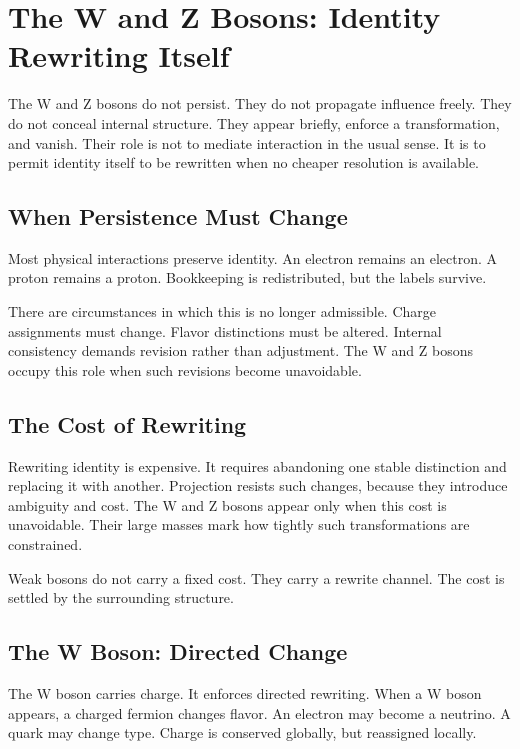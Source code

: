 \documentclass[11pt,twoside,openright]{book}
\begin{document}
\chapter{The W and Z Bosons: Identity Rewriting Itself}

The W and Z bosons do not persist. They do not propagate influence freely. They do not conceal internal structure. They appear briefly, enforce a transformation, and vanish. Their role is not to mediate interaction in the usual sense. It is to permit identity itself to be rewritten when no cheaper resolution is available.

\section*{When Persistence Must Change}

Most physical interactions preserve identity. An electron remains an electron. A proton remains a proton. Bookkeeping is redistributed, but the labels survive.

There are circumstances in which this is no longer admissible. Charge assignments must change. Flavor distinctions must be altered. Internal consistency demands revision rather than adjustment. The W and Z bosons occupy this role when such revisions become unavoidable.

\section*{The Cost of Rewriting}

Rewriting identity is expensive. It requires abandoning one stable distinction and replacing it with another. Projection resists such changes, because they introduce ambiguity and cost. The W and Z bosons appear only when this cost is unavoidable. Their large masses mark how tightly such transformations are constrained.

Weak bosons do not carry a fixed cost. They carry a rewrite channel. The cost is settled by the surrounding structure.

\section*{The W Boson: Directed Change}

The W boson carries charge. It enforces directed rewriting. When a W boson appears, a charged fermion changes flavor. An electron may become a neutrino. A quark may change type. Charge is conserved globally, but reassigned locally.
\end{document}
